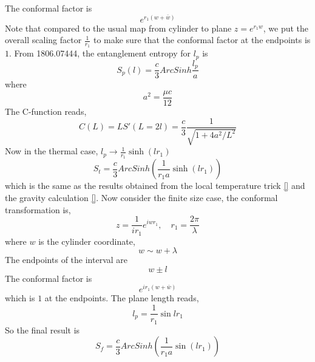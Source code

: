\documentclass[11pt,a4paper]{article}
\begin{document}
	The conformal factor is
	\begin{equation}
	e^{r_1(w+\bar{w})}
	\end{equation}
	Note that compared to the usual map from cylinder to plane $z=e^{r_1 w}$, we put the overall scaling factor $\frac{1}{r_1}$ to make sure that the conformal factor at the endpoints is $1$. From 1806.07444, the entanglement entropy for $l_p$ is
	\begin{equation}
	S_p(l)=\frac{c}{3}ArcSinh\frac{l_p}{a}
	\end{equation}
	where
	\begin{equation}
	a^2=\frac{\mu c}{12}
	\end{equation}
	The C-function reads,
	\begin{equation}
	C(L)=L S'(L=2l)=\frac{c}{3}\frac{1}{\sqrt{1+4a^2/L^2}}
	\end{equation}
	Now in the thermal case, $l_p\rightarrow \frac{1}{r_1}\sinh(l r_1)$
	\begin{equation}
	S_t=\frac{c}{3}ArcSinh(\frac{1}{r_1 a}\sinh(l r_1))
	\end{equation}
	which is the same as the results obtained from the local temperature trick \eqref{} and the gravity calculation \eqref{}. Now consider the finite size case, the conformal transformation is,
	\begin{equation}
	z=\frac{1}{ir_1}e^{iwr_1},\quad
		r_1 = \frac{2\pi}{\lambda}
	\end{equation}
	where $w$ is the cylinder coordinate,
	\begin{equation}
	w\sim w+ \lambda
	\end{equation}
	The endpoints of the interval are 
	\begin{equation}
	w\pm l
	\end{equation}
	The conformal factor is
	\begin{equation}
	e^{ir_1(w+\bar{w})}
	\end{equation}
	which is $1$ at the endpoints. The plane length reads,
	\begin{equation}
	l_p=\frac{1}{r_1}\sin lr_1
	\end{equation}
	So the final result is
	\begin{equation}
	S_f=\frac{c}{3}ArcSinh(\frac{1}{r_1a}\sin(lr_1))
	\end{equation}
	
\pagebreak
	
\end{document}
